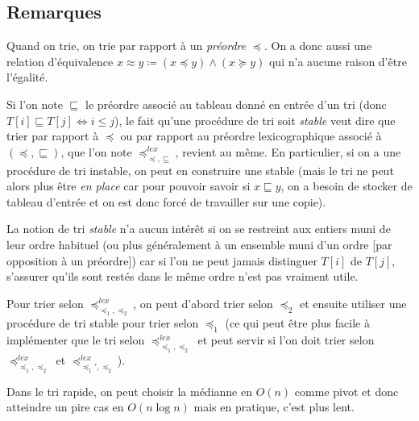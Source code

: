 \documentclass[../../agregation.tex]{subfiles}
\begin{document}
\subsection{Remarques}

Quand on trie, on trie par rapport à un \emph{préordre} $\preccurlyeq$. On a donc aussi une relation d'équivalence $x\approx y\coloneqq (x\preccurlyeq y) \land (x\succcurlyeq y)$ qui n'a aucune raison d'être l'égalité.

Si l'on note $\sqsubseteq$ le préordre associé au tableau donné en entrée d'un tri (donc $T[i]\sqsubseteq T[j] \iff i \le j$), le fait qu'une procédure de tri soit \emph{stable} veut dire que trier par rapport à $\preccurlyeq$ ou par rapport au préordre lexicographique associé à $(\preccurlyeq, \sqsubseteq)$, que l'on note $\preccurlyeq^{lex}_{\preccurlyeq, \sqsubseteq}$, revient au même. En particulier, si on a une procédure de tri instable, on peut en construire une stable (mais le tri ne peut alors plus être \emph{en place} car pour pouvoir savoir si $x\sqsubseteq y$, on a besoin de stocker de tableau d'entrée et on est donc forcé de travailler sur une copie).

La notion de tri \emph{stable} n'a aucun intérêt si on se restreint aux entiers muni de leur ordre habituel (ou plus généralement à un ensemble muni d'un ordre [par opposition à un préordre]) car si l'on ne peut jamais distinguer $T[i]$ de $T[j]$, s'assurer qu'ils sont restés dans le même ordre n'est pas vraiment utile.

Pour trier selon $\preccurlyeq^{lex}_{\preccurlyeq_1, \preccurlyeq_2}$, on peut d'abord trier selon $\preccurlyeq_2$ et ensuite utiliser une procédure de tri stable pour trier selon $\preccurlyeq_1$ (ce qui peut être plus facile à implémenter que le tri selon $\preccurlyeq^{lex}_{\preccurlyeq_1, \preccurlyeq_2}$ et peut servir si l'on doit trier selon $\preccurlyeq^{lex}_{\preccurlyeq_1, \preccurlyeq_2}$ et $\preccurlyeq^{lex}_{\preccurlyeq_1', \preccurlyeq_2}$).

Dans le tri rapide, on peut choisir la médianne en $O(n)$ comme pivot et donc atteindre un pire cas en $O(n\log n)$ mais en pratique, c'est plus lent.
\end{document}
